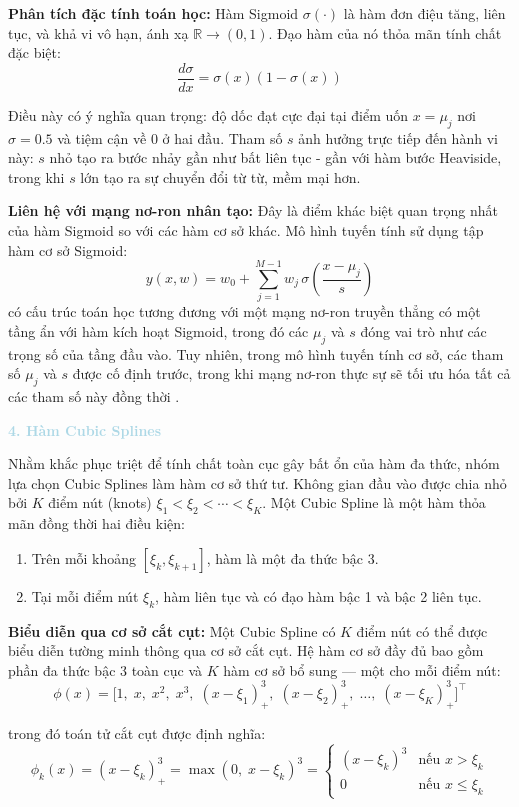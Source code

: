 \textbf{Phân tích đặc tính toán học:} Hàm Sigmoid $\sigma(\cdot)$ là hàm đơn điệu tăng, liên tục, và khả vi vô hạn, ánh xạ $\mathbb{R} \to (0,1)$. Đạo hàm của nó thỏa mãn tính chất đặc biệt:
$$\frac{d\sigma}{dx} = \sigma(x)\left(1 - \sigma(x)\right)$$

Điều này có ý nghĩa quan trọng: độ dốc đạt cực đại tại điểm uốn $x = \mu_j$ nơi $\sigma = 0.5$ và tiệm cận về 0 ở hai đầu. Tham số $s$ ảnh hưởng trực tiếp đến hành vi này: $s$ nhỏ tạo ra bước nhảy gần như bất liên tục - gần với hàm bước Heaviside, trong khi $s$ lớn tạo ra sự chuyển đổi từ từ, mềm mại hơn.

\textbf{Liên hệ với mạng nơ-ron nhân tạo:} Đây là điểm khác biệt quan trọng nhất của hàm Sigmoid so với các hàm cơ sở khác. Mô hình tuyến tính sử dụng tập hàm cơ sở Sigmoid:
$$y(x,w) = w_0 + \sum_{j=1}^{M-1} w_j \,\sigma\!\left(\frac{x-\mu_j}{s}\right)$$
có cấu trúc toán học tương đương với một mạng nơ-ron truyền thẳng có một tầng ẩn với hàm kích hoạt Sigmoid, trong đó các $\mu_j$ và $s$ đóng vai trò như các trọng số của tầng đầu vào. Tuy nhiên, trong mô hình tuyến tính cơ sở, các tham số $\mu_j$ và $s$ được cố định trước, trong khi mạng nơ-ron thực sự sẽ tối ưu hóa tất cả các tham số này đồng thời \cite{bishop2006pattern}.

\noindent\textcolor{lightblue}{\textbf{4. Hàm Cubic Splines}}

Nhằm khắc phục triệt để tính chất toàn cục gây bất ổn của hàm đa thức, nhóm lựa chọn Cubic Splines làm hàm cơ sở thứ tư. Không gian đầu vào được chia nhỏ bởi $K$ điểm nút (knots) $\xi_1 < \xi_2 < \cdots < \xi_K$. Một Cubic Spline là một hàm thỏa mãn đồng thời hai điều kiện:
\begin{enumerate}
    \item Trên mỗi khoảng $[\xi_{k}, \xi_{k+1}]$, hàm là một đa thức bậc 3.
    \item Tại mỗi điểm nút $\xi_k$, hàm liên tục và có đạo hàm bậc 1 và bậc 2 liên tục.
\end{enumerate}

\textbf{Biểu diễn qua cơ sở cắt cụt:} Một Cubic Spline có $K$ điểm nút có thể được biểu diễn tường minh thông qua cơ sở cắt cụt. Hệ hàm cơ sở đầy đủ bao gồm phần đa thức bậc 3 toàn cục và $K$ hàm cơ sở bổ sung — một cho mỗi điểm nút:
$$\phi(x) = \bigl[1,\; x,\; x^2,\; x^3,\; (x-\xi_1)_+^3,\; (x-\xi_2)_+^3,\; \ldots,\; (x-\xi_K)_+^3\bigr]^{\top}$$

trong đó toán tử cắt cụt được định nghĩa:
$$\phi_{k}(x) = (x - \xi_k)_+^3 = \max(0,\; x - \xi_k)^3 = \begin{cases} (x-\xi_k)^3 & \text{nếu } x > \xi_k \\ 0 & \text{nếu } x \leq \xi_k \end{cases}$$

